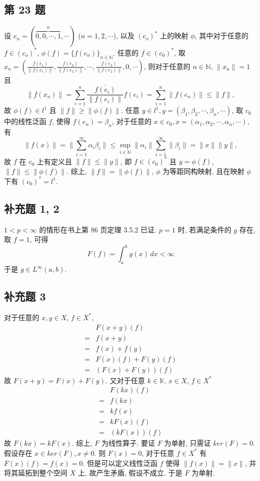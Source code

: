 \documentclass[../main.tex]{subfiles}
\begin{document}
\subsection{第 23 题}
设 $e_n = (\overbrace{0, 0, \cdots, 1}^{n}, \cdots)$ ($n = 1, 2, \cdots$),
以及 $(c_o)^*$ 上的映射 $\phi$,
其中对于任意的 $f \in \left( c_o \right)^*$, $\phi (f) = \{ f(e_n) \}_{n \in \mathbb{N}}$.
任意的 $f \in (c_0)^*$, 取
$x_n = (\frac{\overline{f(e_1)}}{\| f(e_1) \|}, \frac{\overline{f(e_2)}}{\| f(e_2) \|}, \cdots, \frac{\overline{f(e_2)}}{\| f(e_2) \|}, 0, \cdots)$,
则对于任意的 $n \in \mathbb{N}$, $\| x_n \| = 1$ 且
\[
    \| f(x_n) \| = \sum_{i = 1}^{n} \frac{\overline{f(e_i)}}{\| f(e_i) \|} f(e_i) = \sum_{i = 1}^{n} \| f(e_n) \| \leqslant \| f \|,
\]
故 $\phi (f) \in l^1$ 且 $\| f \| \geqslant \| \phi (f) \|$.
任意 $y \in l^1, y = (\beta_1, \beta_2, \cdots, \beta_n, \cdots)$,
取 $c_0$ 中的线性泛函 $f$, 使得 $f(e_n) = \beta_n$,
对于任意的 $x \in c_0, x = (\alpha_1, \alpha_2, \cdots, \alpha_n, \cdots)$, 有
\[
    \| f(x) \|
    = \| \sum_{i = 1}^{\infty} \alpha_i \beta_i \|
    \leqslant \sup_{i \in \mathbb{N}} \| \alpha_i \| \sum_{i = 1}^{\infty} \| \beta_i \|
    = \| x \| \| y \|,
\]
故 $f$ 在 $c_0$ 上有定义且 $\| f \| \leqslant \| y \|$,
即 $f \in (c_0)^*$ 且 $y = \phi (f)$, $\| f \| \leqslant \| \phi (f) \|$.
综上, $\| f \| = \| \phi (f) \|$, $\phi$ 为等距同构映射, 且在映射 $\phi$ 下有 $(c_0)^* = l^1$.

\subsection{补充题 1, 2}
$1 < p < \infty$ 的情形在书上第 86 页定理 3.5.2 已证.
$p = 1$ 时, 若满足条件的 $g$ 存在, 取 $f = 1$, 可得
\[
    F(f) = \int_{a}^{b} g(x) \, dx < \infty
\]
于是 $g \in L^{\infty} (a, b)$.

\subsection{补充题 3}
对于任意的 $x, y \in X$, $f \in X^*$,
\begin{align*}
     & F(x + y)(f) \\
    =& f(x + y) \\
    =& f(x) + f(y) \\
    =& F(x)(f) + F(y)(f) \\
    =& (F(x) + F(y))(f)
\end{align*}
故 $F(x + y) = F(x) + F(y)$.
又对于任意 $k \in \mathbb{K}$, $x \in X$, $f \in X^*$
\begin{align*}
     & F(k x)(f) \\
    =& f(k x) \\
    =& k f(x) \\
    =& k F(x)(f) \\
    =& (k F(x))(f)
\end{align*}
故 $F(k x) = k F(x)$.
综上, $F$ 为线性算子.
要证 $F$ 为单射, 只需证 $ker(F) = {0}$.
假设存在 $x \in ker(F), x \neq 0$.
则 $F(x) = 0$, 对于任意 $f \in X^*$ 有 $F(x)(f) = f(x) = 0$.
但是可以定义线性泛函 $f$ 使得 $\| f(x) \| = \| x \|$, 并将其延拓到整个空间 $X$ 上, 故产生矛盾, 假设不成立. 于是 $F$ 为单射.
\end{document}
